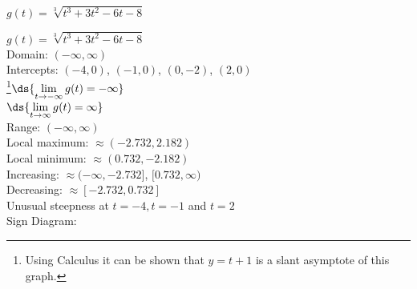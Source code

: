 \documentclass{ximera}
\begin{document}
\begin{question}
$g(t) = \sqrt[3]{t^{3} + 3t^{2} - 6t - 8}$ 

\begin{solution}
$g(t) = \sqrt[3]{t^{3} + 3t^{2} - 6t - 8}$\\
Domain: $(-\infty, \infty)$\\
Intercepts:  $(-4,0)$, $(-1,0)$, $(0,-2)$, $(2,0)$\\
\footnote{Using Calculus it can be shown that $y = t + 1$ is a slant asymptote of this graph.}$\ds{\lim_{t \rightarrow -\infty} g(t) = -\infty}$\\
$\ds{\lim_{t \rightarrow \infty} g(t) = \infty}$\\
Range:  $(-\infty, \infty)$\\
Local maximum:  $\approx (-2.732, 2.182)$\\
Local minimum:  $\approx (0.732, -2.182)$\\
Increasing:  $\approx (-\infty, -2.732]$, $[0.732, \infty)$\\
Decreasing: $\approx [-2.732, 0.732]$\\
Unusual steepness at $t = -4, t = -1$ and $t = 2$\\




Sign Diagram:\\

% 





\end{solution}
\end{question}
\end{document}
